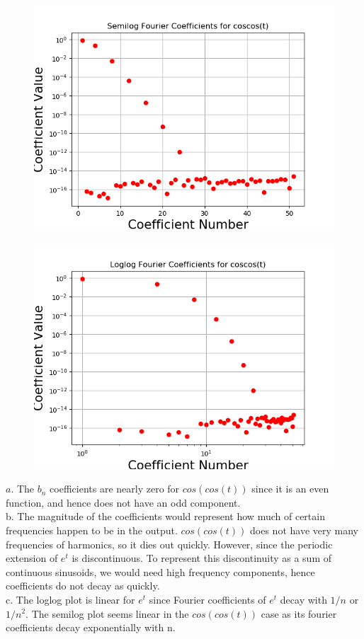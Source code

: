 \documentclass[11pt, a4paper]{article}
\begin{document}
\begin{figure}[!tbh]
   	\centering
   	\includegraphics[scale=0.5]{Figure_51.png}
   	\label{fig:11}
   \end{figure}
\begin{figure}[!tbh]
   	\centering
   	\includegraphics[scale=0.5]{Figure_61.png}
   	\label{fig:21}
   \end{figure}

{$a.$ The $b_{n}$ coefficients are nearly zero for $cos(cos(t))$ since it is an even function, and hence does not have an odd component.}
\\
{b. The magnitude of the coefficients would represent how much of certain frequencies happen to be in the output. $cos(cos(t))$ does not have very many frequencies of harmonics, so it dies out quickly. However, since the periodic extension of $e^{t}$ is discontinuous. To represent this discontinuity as a sum of continuous sinusoids, we would need high frequency components, hence coefficients do not decay as quickly.}
\\
{c. The loglog plot is linear for $e^{t}$ since Fourier coefficients of $e^{t}$ decay with $1/n$ or $1/n^{2}$. The semilog plot seems linear in the $cos(cos(t))$ case as its fourier coefficients decay exponentially with n.
}
\end{document}
